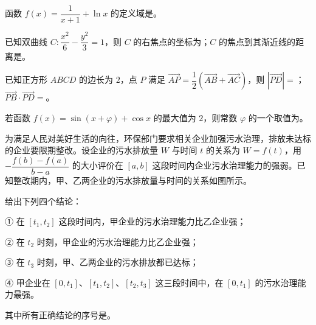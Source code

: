 \begin{question}
函数 $f(x)=\dfrac1{x+1}+\ln x$ 的定义域是\gkblank{}。

\end{question}
\begin{question}
已知双曲线 $C:\dfrac{x^2}6-\dfrac{y^2}3=1$，则 $C$ 的右焦点的坐标为\gkblank{}；$C$ 的焦点到其渐近线的距离是\gkblank{}。

\end{question}
\begin{question}
已知正方形 $ABCD$ 的边长为 $2$，点 $P$ 满足 $\overrightarrow{AP}=\dfrac12\left(\overrightarrow{AB}+\overrightarrow{AC}\right)$，则 $|\overrightarrow{PD}|=$\gkblank{}；$\overrightarrow{PB}\cdot\overrightarrow{PD}=$\gkblank{}。

\end{question}
\begin{question}
若函数 $f(x)=\sin(x+\varphi)+\cos x$ 的最大值为 $2$，则常数 $\varphi$ 的一个取值为\gkblank{}。

\Needspace{0.4\textheight}
\end{question}
\begin{question}
为满足人民对美好生活的向往，环保部门要求相关企业加强污水治理，排放未达标的企业要限期整改。设企业的污水排放量 $W$ 与时间 $t$ 的关系为 $W=f(t)$，用 $-\dfrac{f(b)-f(a)}{b-a}$ 的大小评价在 $[a,b]$ 这段时间内企业污水治理能力的强弱。已知整改期内，甲、乙两企业的污水排放量与时间的关系如图所示。
\nopagebreak[4]
\begin{center}\end{center}
\nopagebreak[4]
给出下列四个结论：

① 在 $[t_1,t_2]$ 这段时间内，甲企业的污水治理能力比乙企业强；

② 在 $t_2$ 时刻，甲企业的污水治理能力比乙企业强；

③ 在 $t_3$ 时刻，甲、乙两企业的污水排放都已达标；

④ 甲企业在 $[0,t_1]$、$[t_1,t_2]$、$[t_2,t_3]$ 这三段时间中，在 $[0,t_1]$ 的污水治理能力最强。

其中所有正确结论的序号是\gkblank{}。

\end{question}

